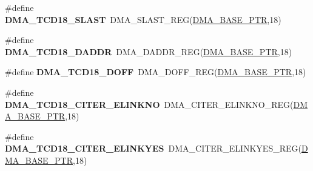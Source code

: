 \begin{DoxyCompactItemize}
\item 
\hypertarget{group___d_m_a___register___accessor___macros_gab3b879c5f4a602fe6076805df15cae73}{}\#define {\bfseries D\+M\+A\+\_\+\+T\+C\+D18\+\_\+\+S\+L\+A\+S\+T}~D\+M\+A\+\_\+\+S\+L\+A\+S\+T\+\_\+\+R\+E\+G(\hyperlink{group___d_m_a___peripheral_ga6997fbc1b1973e9f27170217a3bd6f22}{D\+M\+A\+\_\+\+B\+A\+S\+E\+\_\+\+P\+T\+R},18)\label{group___d_m_a___register___accessor___macros_gab3b879c5f4a602fe6076805df15cae73}

\item 
\hypertarget{group___d_m_a___register___accessor___macros_ga35d23b6317e604dec87a9b246e15fd8b}{}\#define {\bfseries D\+M\+A\+\_\+\+T\+C\+D18\+\_\+\+D\+A\+D\+D\+R}~D\+M\+A\+\_\+\+D\+A\+D\+D\+R\+\_\+\+R\+E\+G(\hyperlink{group___d_m_a___peripheral_ga6997fbc1b1973e9f27170217a3bd6f22}{D\+M\+A\+\_\+\+B\+A\+S\+E\+\_\+\+P\+T\+R},18)\label{group___d_m_a___register___accessor___macros_ga35d23b6317e604dec87a9b246e15fd8b}

\item 
\hypertarget{group___d_m_a___register___accessor___macros_gaf2e59eca9aa0604f0804dca08fe8b178}{}\#define {\bfseries D\+M\+A\+\_\+\+T\+C\+D18\+\_\+\+D\+O\+F\+F}~D\+M\+A\+\_\+\+D\+O\+F\+F\+\_\+\+R\+E\+G(\hyperlink{group___d_m_a___peripheral_ga6997fbc1b1973e9f27170217a3bd6f22}{D\+M\+A\+\_\+\+B\+A\+S\+E\+\_\+\+P\+T\+R},18)\label{group___d_m_a___register___accessor___macros_gaf2e59eca9aa0604f0804dca08fe8b178}

\item 
\hypertarget{group___d_m_a___register___accessor___macros_ga8571c573f782990737d532c2ca055f5b}{}\#define {\bfseries D\+M\+A\+\_\+\+T\+C\+D18\+\_\+\+C\+I\+T\+E\+R\+\_\+\+E\+L\+I\+N\+K\+N\+O}~D\+M\+A\+\_\+\+C\+I\+T\+E\+R\+\_\+\+E\+L\+I\+N\+K\+N\+O\+\_\+\+R\+E\+G(\hyperlink{group___d_m_a___peripheral_ga6997fbc1b1973e9f27170217a3bd6f22}{D\+M\+A\+\_\+\+B\+A\+S\+E\+\_\+\+P\+T\+R},18)\label{group___d_m_a___register___accessor___macros_ga8571c573f782990737d532c2ca055f5b}

\item 
\hypertarget{group___d_m_a___register___accessor___macros_gaa08ff8347355d3fb70c5c40eefe15370}{}\#define {\bfseries D\+M\+A\+\_\+\+T\+C\+D18\+\_\+\+C\+I\+T\+E\+R\+\_\+\+E\+L\+I\+N\+K\+Y\+E\+S}~D\+M\+A\+\_\+\+C\+I\+T\+E\+R\+\_\+\+E\+L\+I\+N\+K\+Y\+E\+S\+\_\+\+R\+E\+G(\hyperlink{group___d_m_a___peripheral_ga6997fbc1b1973e9f27170217a3bd6f22}{D\+M\+A\+\_\+\+B\+A\+S\+E\+\_\+\+P\+T\+R},18)\label{group___d_m_a___register___accessor___macros_gaa08ff8347355d3fb70c5c40eefe15370}


\end{DoxyCompactItemize}
